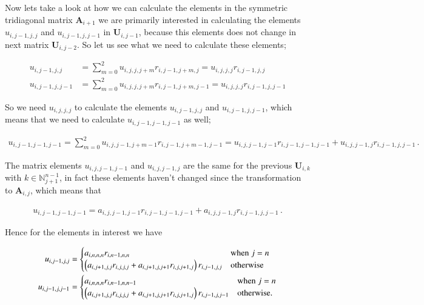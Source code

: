 \documentclass[11pt,english,a4paper]{article}
\begin{document}
\begin{flushleft}
Now lets take a look at how we can calculate the elements in the symmetric tridiagonal matrix $\textbf{A}_{i+1}$ we are primarily interested in calculating the elements $u_{i,j-1,j,j}$ and $u_{i,j-1,j,j-1}$ in $\textbf{U}_{i,j-1}$, because this elements does not change in next matrix $\textbf{U}_{i,j-2}$. So let us see what we need to calculate these elements;

\begin{align*}
u_{i,j-1,j,j} &= \sum_{m=0}^2 u_{i,j,j,j+m} r_{i,j-1,j+m,j}  =  u_{i,j,j,j} r_{i,j-1,j,j}
\\
u_{i,j-1,j,j-1} &= \sum_{m=0}^2 u_{i,j,j,j+m} r_{i,j-1,j+m,j-1} = u_{i,j,j,j} r_{i,j-1,j,j-1}
\end{align*}

So we need $u_{i,j,j,j}$ to calculate the elements $u_{i,j-1,j,j}$ and $u_{i,j-1,j,j-1}$, which means that we need to calculate $u_{i,j-1,j-1,j-1}$ as well;

\begin{align*}
u_{i,j-1,j-1,j-1} = \sum_{m=0}^2 u_{i,j,j-1,j+m-1} r_{i,j-1,j+m-1,j-1} = u_{i,j,j-1,j-1} r_{i,j-1,j-1,j-1} + u_{i,j,j-1,j} r_{i,j-1,j,j-1} \,.
\end{align*}

The matrix elements $u_{i,j,j-1,j-1}$ and $u_{i,j,j-1,j}$ are the same for the previous $\textbf{U}_{i,k}$ with $k \in \mathbb{N}_{j+1}^{n-1}$, in fact these elements haven't changed since the transformation to $\textbf{A}_{i,j}$, which means that

\begin{align*}
u_{i,j-1,j-1,j-1} = a_{i,j,j-1,j-1} r_{i,j-1,j-1,j-1} + a_{i,j,j-1,j} r_{i,j-1,j,j-1} \,.
\end{align*}

Hence for the elements in interest we have

\begin{align*}
u_{i,j-1,j,j} &= \begin{cases} a_{i,n,n,n} r_{i,n-1,n,n} & \text{when } j = n \\ \left({a_{i,j+1,j,j} r_{i,j,j,j} + a_{i,j+1,j,j+1} r_{i,j,j+1,j}}\right)r_{i,j-1,j,j} & \text{otherwise}\end{cases}
\\
u_{i,j-1,j,j-1} &= \begin{cases} a_{i,n,n,n} r_{i,n-1,n,n-1} & \text{when } j= n \\ \left({a_{i,j+1,j,j} r_{i,j,j,j} + a_{i,j+1,j,j+1} r_{i,j,j+1,j}}\right) r_{i,j-1,j,j-1} & \text{otherwise.}\end{cases}
\end{align*}


\end{flushleft}
\end{document}
